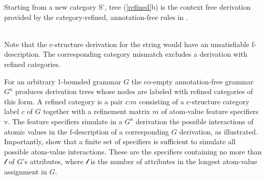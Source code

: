 \documentclass[output=paper,hidelinks]{langscibook}
\begin{document}
\noindent Starting from a new category S', tree (\ref{refined}b) is the context free derivation provided by the category-refined, annotation-free rules in .
\ea\label{annofree}\small
{} \hsp{-.2em}\rarrow {}\\[1ex]
\hspace*{-2em} 
\hsp{-.9em} \rarrow {} \! \hsp{1.8em}
\hsp{-.5em}\rarrow \ \ \hsp{-1em}
\z

\noindent Note that the c-structure derivation for the string  would have an unsatisfiable f-description. The corresponding category mismatch excludes a derivation with refined categories.

\def\cm#1#2{$#1$:$#2$\xspace}
For an arbitrary 1-bounded grammar $G$ the co-empty annotation-free grammar $G^a$ produces derivation trees whose nodes are labeled with refined categories of this form.  A refined category is a pair \cm cm consisting of a c-structure category label $c$ of $G$ together with a refinement matrix $m$ of atom-value feature specifiers v.  The feature specifiers simulate in a $G^a$ derivation the possible interactions of atomic values in the f-description of a corresponding $G$ derivation, as illustrated.  Importantly, \cite{wed:kap:20} show that a finite set of specifiers is sufficient to simulate all possible atom-value interactions.  These are the specifiers containing no more than $\mathscr l$ of $G$'s attributes, where $\mathscr l$ is the number of attributes in the longest atom-value assignment in $G$.
\end{document}
